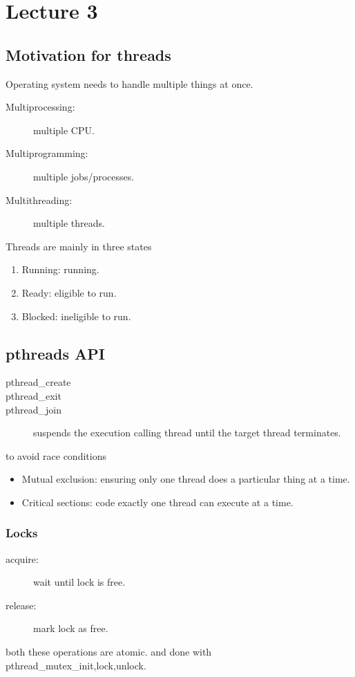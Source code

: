 \section{Lecture 3}
\subsection{Motivation for threads}
Operating system needs to handle multiple things at once.
\begin{description}
    \item[Multiprocessing:] multiple CPU.
    \item[Multiprogramming:] multiple jobs/processes.
    \item[Multithreading:] multiple threads.   
\end{description}
Threads are mainly in three states 
\begin{enumerate}
    \item Running: running.
    \item Ready: eligible to run.
    \item Blocked: ineligible to run.
\end{enumerate}

\subsection{pthreads API}
\begin{description}
    \item[pthread\_create]
    \item[pthread\_exit] 
    \item[pthread\_join] suspends the execution calling thread until the target thread terminates.  
\end{description}

to avoid race conditions
\begin{itemize}
    \item Mutual exclusion: ensuring only one thread does a particular thing at a time.
    \item Critical sections: code exactly one thread can execute at a time.
\end{itemize}

\subsubsection*{Locks}
\begin{description}
    \item[acquire:] wait until lock is free.
    \item[release:] mark lock as free.  
\end{description}
both these operations are atomic. and done with pthread\_mutex\_init,lock,unlock.

